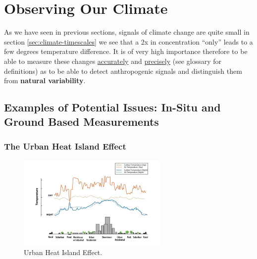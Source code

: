 \section{Observing Our Climate}
\label{sec:observing_climate}

As we have seen in previous sections, signals of climate change are quite small
in section \ref{sec:climate-timescales} we see that a 2x in  concentration
``only'' leads to a few degrees temperature difference. It is of very high 
importance therefore to be able to measure these changes 
\hyperlink{glo:accuracy}{accurately} and \hyperlink{glo:precision}{precisely} 
(see glossary for definitions) as to be able to detect anthropogenic signals
and distinguish them from \textbf{natural variability}.\\

\subsection{Examples of Potential Issues: In-Situ and Ground Based Measurements}
\label{sec:issues}

\subsubsection{The Urban Heat Island Effect}
\label{sec:uhi}

\begin{figure}[h]
    \centering
    \includegraphics[width=0.65\textwidth]{figures/urban_heat_island.jpeg}
    \caption{Urban Heat Island Effect.}
    \label{fig:uhi}
\end{figure}

